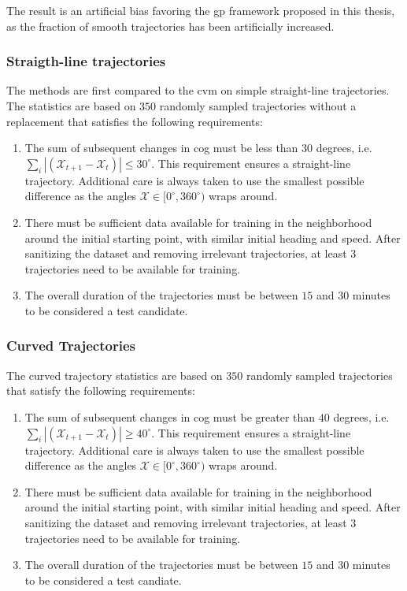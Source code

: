 The result is an artificial bias favoring the \acrshort{gp} framework proposed in this thesis, as the fraction of smooth trajectories has been artificially increased.

\subsubsection{Straigth-line trajectories}
The methods are first compared to the \acrshort{cvm} on simple straight-line trajectories. The statistics are based on $350$ randomly sampled trajectories without a replacement that satisfies the following requirements:
\begin{enumerate}
    \item The sum of subsequent changes in \acrshort{cog} must be less than $30$ degrees, i.e. $\sum_i |(\mathcal{X}_{t+1} - \mathcal{X}_t)| \leq 30^\circ$. This requirement ensures a straight-line trajectory. Additional care is always taken to use the smallest possible difference as the angles $\mathcal{X} \in [0^\circ, 360^\circ)$ wraps around.
    \item There must be sufficient data available for training in the neighborhood around the initial starting point, with similar initial heading and speed. After sanitizing the dataset and removing irrelevant trajectories, at least $3$ trajectories need to be available for training.
    \item The overall duration of the trajectories must be between $15$ and $30$ minutes to be considered a test candidate.
\end{enumerate}

\subsubsection{Curved Trajectories}
The curved trajectory statistics are based on $350$ randomly sampled trajectories that satisfy the following requirements:
\begin{enumerate}
    \item The sum of subsequent changes in \acrshort{cog} must be greater than $40$ degrees, i.e. $\sum_i |(\mathcal{X}_{t+1} - \mathcal{X}_t)| \geq 40^\circ$. This requirement ensures a straight-line trajectory. Additional care is always taken to use the smallest possible difference as the angles $\mathcal{X} \in [0^\circ, 360^\circ)$ wraps around.
    \item There must be sufficient data available for training in the neighborhood around the initial starting point, with similar initial heading and speed. After sanitizing the dataset and removing irrelevant trajectories, at least $3$ trajectories need to be available for training.
    \item The overall duration of the trajectories must be between $15$ and $30$ minutes to be considered a test candiate.
\end{enumerate}


